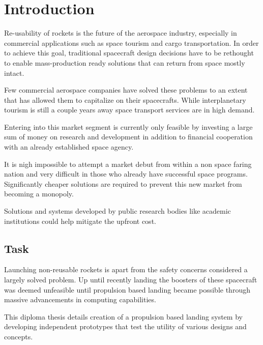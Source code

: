 \chapter{Introduction}

Re-usability of rockets is the future of the aerospace industry, especially in commercial applications such as space tourism and cargo transportation. In order to achieve this goal, traditional spacecraft design decisions have to be rethought to enable mass-production ready solutions that can return from space mostly intact. 

Few commercial aerospace companies have solved these problems to an extent that has allowed them to capitalize on their spacecrafts. While interplanetary tourism is still a couple years away space transport services are in high demand.

Entering into this market segment is currently only feasible by investing a large sum of money on research and development in addition to financial cooperation with an already established space agency.

It is nigh impossible to attempt a market debut from within a non space faring nation and very difficult in those who already have successful space programs. Significantly cheaper solutions are required to prevent this new market from becoming a monopoly.

Solutions and systems developed by public research bodies like academic institutions could help mitigate the upfront cost.

\section{Task}

Launching non-reusable rockets is apart from the safety concerns considered a largely solved problem. Up until recently landing the boosters of these spacecraft was deemed unfeasible until propulsion based landing became possible through massive advancements in computing capabilities. 

This diploma thesis details creation of a propulsion based landing system by developing independent prototypes that test the utility of various designs and concepts.